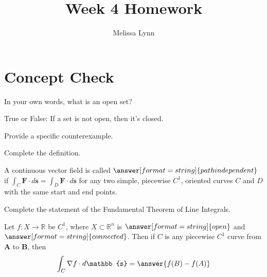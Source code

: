 \documentclass{ximera}
\title{Week 4 Homework}
\author{Melissa Lynn}
\begin{document}
  
\begin{abstract}  
\end{abstract}  
\maketitle

\section{Concept Check}

\begin{problem}
In your own words, what is an open set?
\begin{freeResponse}
\end{freeResponse}
\end{problem}

\begin{problem}
True or False: If a set is not open, then it's closed.
\begin{multipleChoice}
\end{multipleChoice}
\begin{problem}
Provide a specific counterexample.
\begin{freeResponse}
\end{freeResponse}
\end{problem}
\end{problem}

\begin{problem}
Complete the definition.

A continuous vector field is called $\answer[format=string]{path independent}$ if $\int_C\mathbf{F}\cdot d\mathbf{s} = \int_D\mathbf{F}\cdot d\mathbf{s}$ for any two simple, piecewise $C^1$, oriented curves $C$ and $D$ with the same start and end points.
\end{problem}

\begin{problem}
Complete the statement of the Fundamental Theorem of Line Integrals.

Let $f:X\rightarrow\mathbb{R}$ be $C^1$, where $X\subset\mathbb{R}^n$ is $\answer[format=string]{open}$ and $\answer[format=string]{connected}$. Then if $C$ is any piecewise $C^1$ curve from $\mathbf{A}$ to $\mathbf{B}$, then
\[
\int_C\nabla f\cdot d\mathbb{s} = \answer{f(B)-f(A)}
\]
\end{problem}
\end{document}
